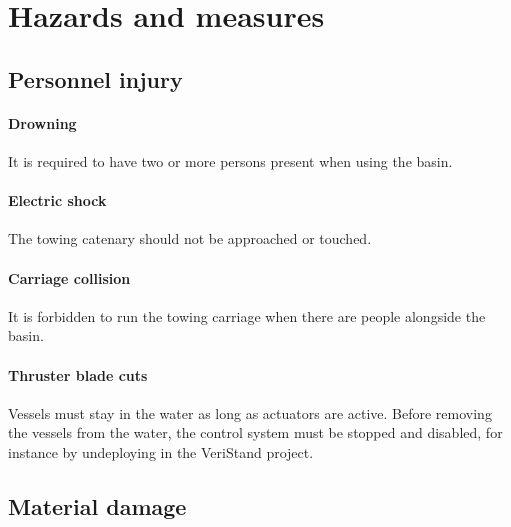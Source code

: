 \documentclass[a4paper,twoside,english]{report}
\begin{document}
\section{Hazards and measures}

\subsection{Personnel injury}

\paragraph{Drowning}
It is required to have two or more persons present when using the basin.

\paragraph{Electric shock}
The towing catenary should not be approached or touched.

\paragraph{Carriage collision}
It is forbidden to run the towing carriage when there are people alongside
the basin.

\paragraph{Thruster blade cuts}
Vessels must stay in the water as long as actuators are active. Before
removing the vessels from the water, the control system must be stopped
and disabled, for instance by undeploying in the VeriStand project.

\subsection{Material damage}
\end{document}
